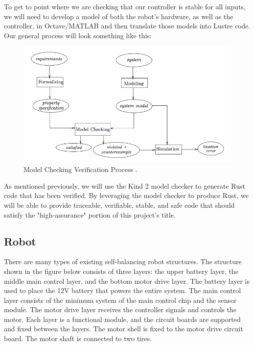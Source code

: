 \documentclass[a4paper,12pt]{article}
\begin{document}
To get to point where we are checking that our controller is stable for all inputs, we will need to develop a model of both the robot’s hardware, as well as the controller, in Octave/MATLAB and then translate those models into Lustre code. Our general process will look something like this:
 \begin{figure}[H]
\includegraphics[width = \textwidth]{images/PDS_ModelChecker.png}
\caption{Model Checking Verification Process \cite{baier}.}
	\end{figure}
\par

As mentioned previously, we will use the Kind 2 model checker to generate Rust code that has been verified. By leveraging the model checker to produce Rust, we will be able to provide traceable, verifiable, stable, and safe code that should satisfy the "high-assurance" portion of this project's title.

\subsection{Robot}
There are many types of existing self-balancing robot structures. The structure shown in the figure below consists of three layers: the upper battery layer, the middle main control layer, and the bottom motor drive layer. The battery layer is used to place the 12V battery that powers the entire system. The main control layer consists of the minimum system of the main control chip and the sensor module. The motor drive layer receives the controller signals and controls the motor. Each layer is a functional module, and the circuit boards are supported and fixed between the layers. The motor shell is fixed to the motor drive circuit board. The motor shaft is connected to two tires.
\end{document}
